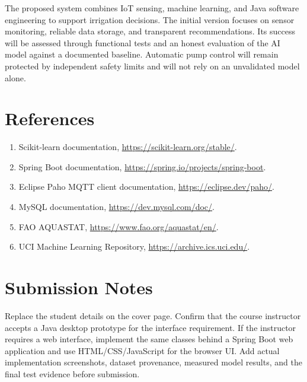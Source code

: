 \documentclass[12pt,a4paper]{report}
\begin{document}
The proposed system combines IoT sensing, machine learning, and Java software engineering to support irrigation decisions. The initial version focuses on sensor monitoring, reliable data storage, and transparent recommendations. Its success will be assessed through functional tests and an honest evaluation of the AI model against a documented baseline. Automatic pump control will remain protected by independent safety limits and will not rely on an unvalidated model alone.

\chapter{References}

\begin{enumerate}[leftmargin=*]

\item Scikit-learn documentation, \url{https://scikit-learn.org/stable/}.

\item Spring Boot documentation, \url{https://spring.io/projects/spring-boot}.

\item Eclipse Paho MQTT client documentation, \url{https://eclipse.dev/paho/}.

\item MySQL documentation, \url{https://dev.mysql.com/doc/}.

\item FAO AQUASTAT, \url{https://www.fao.org/aquastat/en/}.

\item UCI Machine Learning Repository, \url{https://archive.ics.uci.edu/}.

\end{enumerate}

\appendix

\chapter{Submission Notes}

Replace the student details on the cover page. Confirm that the course instructor accepts a Java desktop prototype for the interface requirement. If the instructor requires a web interface, implement the same classes behind a Spring Boot web application and use HTML/CSS/JavaScript for the browser UI. Add actual implementation screenshots, dataset provenance, measured model results, and the final test evidence before submission.
\end{document}
